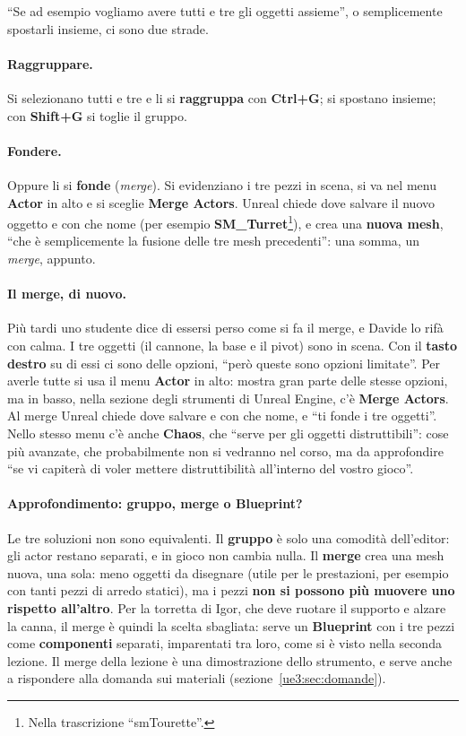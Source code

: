 ``Se ad esempio vogliamo avere tutti e tre gli oggetti assieme'', o semplicemente
spostarli insieme, ci sono due strade.

\paragraph{Raggruppare.} Si selezionano tutti e tre e li si \textbf{raggruppa} con
\textbf{Ctrl+G}; si spostano insieme; con \textbf{Shift+G} si toglie il gruppo.

\paragraph{Fondere.} Oppure li si \textbf{fonde} (\emph{merge}). Si evidenziano i tre
pezzi in scena, si va nel menu \textbf{Actor} in alto e si sceglie \textbf{Merge
Actors}. Unreal chiede dove salvare il nuovo oggetto e con che nome (per esempio
\textbf{SM\_Turret}\footnote{Nella trascrizione ``smTourette''.}), e crea una
\textbf{nuova mesh}, ``che è semplicemente la fusione delle tre mesh precedenti'': una
somma, un \emph{merge}, appunto.

\paragraph{Il merge, di nuovo.} Più tardi uno studente dice di essersi perso come si fa
il merge, e Davide lo rifà con calma. I tre oggetti (il cannone, la base e il pivot)
sono in scena. Con il \textbf{tasto destro} su di essi ci sono delle opzioni, ``però
queste sono opzioni limitate''. Per averle tutte si usa il menu \textbf{Actor} in alto:
mostra gran parte delle stesse opzioni, ma in basso, nella sezione degli strumenti di
Unreal Engine, c'è \textbf{Merge Actors}. Al merge Unreal chiede dove salvare e con che
nome, e ``ti fonde i tre oggetti''. Nello stesso menu c'è anche \textbf{Chaos}, che
``serve per gli oggetti distruttibili'': cose più avanzate, che probabilmente non si
vedranno nel corso, ma da approfondire ``se vi capiterà di voler mettere distruttibilità
all'interno del vostro gioco''.

\paragraph{Approfondimento: gruppo, merge o Blueprint?} Le tre soluzioni non sono
equivalenti. Il \textbf{gruppo} è solo una comodità dell'editor: gli actor restano
separati, e in gioco non cambia nulla. Il \textbf{merge} crea una mesh nuova, una sola:
meno oggetti da disegnare (utile per le prestazioni, per esempio con tanti pezzi di
arredo statici), ma i pezzi \textbf{non si possono più muovere uno rispetto
all'altro}. Per la torretta di Igor, che deve ruotare il supporto e alzare la canna, il
merge è quindi la scelta sbagliata: serve un \textbf{Blueprint} con i tre pezzi come
\textbf{componenti} separati, imparentati tra loro, come si è visto nella seconda
lezione. Il merge della lezione è una dimostrazione dello strumento, e serve anche a
rispondere alla domanda sui materiali (sezione~\ref{ue3:sec:domande}).

